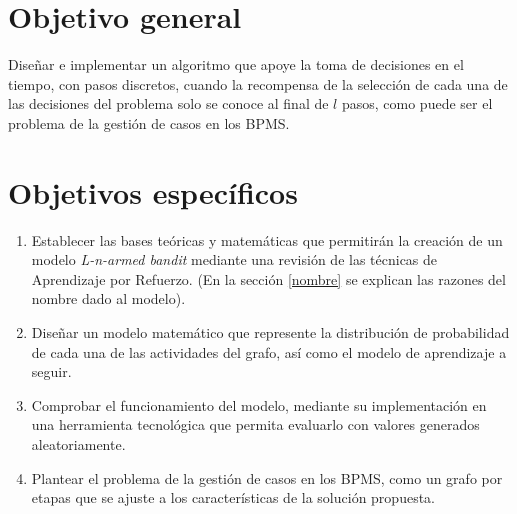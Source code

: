 


\section{Objetivo general}

Diseñar e implementar un algoritmo que apoye la toma de decisiones en el tiempo, con pasos discretos, cuando la recompensa de la selección de cada una de las decisiones del problema solo se conoce al final de $l$ pasos, como puede ser el problema de la gestión de casos en los BPMS.

\section{Objetivos específicos}\label{objespe}

\renewcommand{\labelenumi}{\theenumi}
\renewcommand{\theenumi}{\ref{objespe}.\arabic{enumi}.}
\renewcommand{\theenumii}{\theenumi\arabic{enumii}}
\begin{enumerate}

\item Establecer las bases teóricas y matemáticas que permitirán la creación de un modelo \textit{L-n-armed bandit} mediante una revisión de las técnicas de Aprendizaje por Refuerzo. (En la sección \ref{nombre} se explican las razones del nombre dado al modelo).

\item Diseñar un modelo matemático que represente la distribución de probabilidad de cada una de las actividades del grafo, así como el modelo de aprendizaje a seguir.

\item Comprobar el funcionamiento del modelo, mediante su implementación en una herramienta tecnológica que permita evaluarlo con valores generados aleatoriamente.  

\item Plantear el problema de la gestión de casos en los BPMS, como un grafo por etapas que se ajuste a los características de la solución propuesta.
\end{enumerate}
 \renewcommand{\labelenumi}{\arabic{enumi}.}
\renewcommand{\labelenumii}{\theenumi.\arabic{enumii}.}

